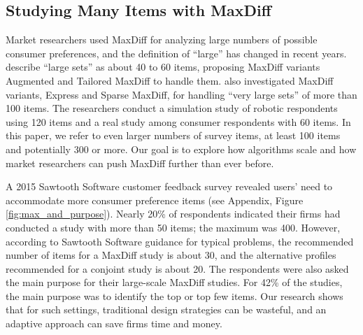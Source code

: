\documentclass[nonblindrev]{informs3}
\begin{document}
\subsection{Studying Many Items with MaxDiff}

Market researchers used MaxDiff for analyzing large numbers of possible consumer preferences, and the definition of ``large'' has changed in recent years. \cite{hendrix2007alternative} describe ``large sets'' as about 40 to 60 items, proposing MaxDiff variants Augmented and Tailored MaxDiff to handle them. \cite{wirth2012largeset} also investigated MaxDiff variants, Express and Sparse MaxDiff, for handling ``very large sets'' of more than 100 items. The researchers conduct a simulation study of robotic respondents using 120 items and a real study among consumer respondents with 60 items. In this paper, we refer to even larger numbers of survey items, at least 100 items and potentially 300 or more. Our goal is to explore how algorithms scale and how market researchers can push MaxDiff further than ever before.

A 2015 Sawtooth Software customer feedback survey revealed users' need to accommodate more consumer preference items (see Appendix, Figure \ref{fig:max_and_purpose}). Nearly 20\% of respondents indicated their firms had conducted a study with more than 50 items; the maximum was 400. However, according to Sawtooth Software guidance for typical problems, the recommended number of items for a MaxDiff study is about 30, and the alternative profiles recommended for a conjoint study is about 20. The respondents were also asked the main purpose for their large-scale MaxDiff studies. For 42\% of the studies, the main purpose was to identify the top or top few items. Our research shows that for such settings, traditional design strategies can be wasteful, and an adaptive approach can save firms time and money.




\end{document}
